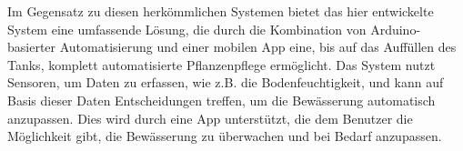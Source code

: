 Im Gegensatz zu diesen herkömmlichen Systemen bietet das hier entwickelte System eine umfassende Lösung, die durch die Kombination von Arduino-basierter Automatisierung und einer mobilen App eine, bis auf das Auffüllen des Tanks, komplett automatisierte Pflanzenpflege ermöglicht. Das System nutzt Sensoren, um Daten zu erfassen, wie z.B. die Bodenfeuchtigkeit, und kann auf Basis dieser Daten Entscheidungen treffen, um die Bewässerung automatisch anzupassen. Dies wird durch eine App unterstützt, die dem Benutzer die Möglichkeit gibt, die Bewässerung zu überwachen und bei Bedarf anzupassen.

